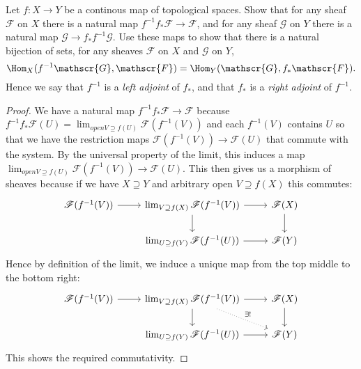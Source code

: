 \begin{exercise}%
	Let $f: X\to Y $ be a continous map of topological spaces. Show that for any sheaf $\mathscr{F} $ on $X $ there is a natural map $f^{-1}f_\ast \mathscr{F} \to \mathscr{F} $, and for any sheaf $\mathscr{G} $ on $Y $ there is a natural map $\mathscr{G} \to f_\ast f^{-1}\mathscr{G} $. Use these maps to show that there is a natural bijection of sets, for any sheaves $\mathscr{F} $ on $X $ and $\mathscr{G} $ on $Y $,
	\[
		\Hom_X(f^{-1}\mathscr{G},\mathscr{F}) = \Hom_Y(\mathscr{G},f_\ast \mathscr{F})
	.\] 
	Hence we say that $f ^{-1} $ is a \textit{left adjoint} of $f_\ast $, and that $f_\ast $ is a \textit{right adjoint} of $f^{-1} $.
\end{exercise}
\begin{proof}
	We have a natural map $f^{-1}f_\ast \mathscr{F} \to \mathscr{F} $ because $f^{-1}f_\ast \mathscr{F}(U) = \lim_{open V \supseteq f(U)} \mathscr{F}(f^{-1}(V)) $ and each $f^{-1}(V) $ contains $U $ so that we have the restriction maps $\mathscr{F}(f^{-1}(V)) \to \mathscr{F}(U) $ that commute with the system.
	By the universal property of the limit, this induces a map $\lim_{open V \supseteq f(U)} \mathscr{F}(f^{-1}(V)) \to \mathscr{F}(U) $.
	This then gives us a morphism of sheaves because if we have $X \supseteq Y $ and arbitrary open $V \supseteq f(X) $ this commutes:
	\[
	\begin{tikzcd}
		\mathscr{F}(f^{-1}(V)) & \lim_{V \supseteq f(X)} \mathscr{F}(f^{-1}(V)) & \mathscr{F}(X)\\
				       & \lim_{U \supseteq f(Y)} \mathscr{F}(f^{-1}(U)) & \mathscr{F}(Y)
	\arrow[from=1-1,to=1-2]
	\arrow[from=1-2,to=1-3]
	\arrow[from=1-2,to=2-2]
	\arrow[from=2-2,to=2-3]
	\arrow[from=1-3,to=2-3]
	\end{tikzcd}
	\]
	Hence by definition of the limit, we induce a unique map from the top middle to the bottom right:
	\[
	\begin{tikzcd}
		\mathscr{F}(f^{-1}(V)) & \lim_{V \supseteq f(X)} \mathscr{F}(f^{-1}(V)) & \mathscr{F}(X)\\
				       & \lim_{U \supseteq f(Y)} \mathscr{F}(f^{-1}(U)) & \mathscr{F}(Y)
	\arrow[from=1-1,to=1-2]
	\arrow[from=1-2,to=1-3]
	\arrow[from=1-2,to=2-2]
	\arrow[from=2-2,to=2-3]
	\arrow[from=1-3,to=2-3]
	\arrow["\exists!",dotted,from=1-2,to=2-3]
	\end{tikzcd}
	\]
	This shows the required commutativity.


\end{proof}
